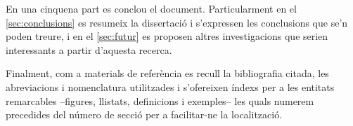 En una cinquena part es conclou el document. Particularment en el
\autoref{sec:conclusions} es resumeix la dissertació i s'expressen les
conclusions que se'n poden treure, i en el \autoref{sec:futur} es
proposen altres investigacions que serien interessants a partir
d'aquesta recerca.




Finalment, com a materials de referència es recull la bibliografia
citada, les abreviacions i nomenclatura utilitzades i s'ofereixen
índexs per a les entitats remarcables --figures, llistats, definicions
i exemples-- les quals numerem precedides del número de secció per a
facilitar-ne la localització.





















